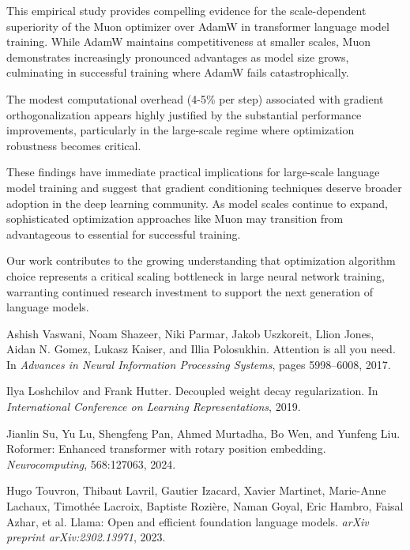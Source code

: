 \documentclass[11pt,a4paper]{article}
\begin{document}
This empirical study provides compelling evidence for the scale-dependent superiority of the Muon optimizer over AdamW in transformer language model training. While AdamW maintains competitiveness at smaller scales, Muon demonstrates increasingly pronounced advantages as model size grows, culminating in successful training where AdamW fails catastrophically.

The modest computational overhead (4-5\% per step) associated with gradient orthogonalization appears highly justified by the substantial performance improvements, particularly in the large-scale regime where optimization robustness becomes critical.

These findings have immediate practical implications for large-scale language model training and suggest that gradient conditioning techniques deserve broader adoption in the deep learning community. As model scales continue to expand, sophisticated optimization approaches like Muon may transition from advantageous to essential for successful training.

Our work contributes to the growing understanding that optimization algorithm choice represents a critical scaling bottleneck in large neural network training, warranting continued research investment to support the next generation of language models.

\begin{thebibliography}{9}

Ashish Vaswani, Noam Shazeer, Niki Parmar, Jakob Uszkoreit, Llion Jones, Aidan N. Gomez, Lukasz Kaiser, and Illia Polosukhin.
\newblock Attention is all you need.
\newblock In \emph{Advances in Neural Information Processing Systems}, pages 5998--6008, 2017.

Ilya Loshchilov and Frank Hutter.
\newblock Decoupled weight decay regularization.
\newblock In \emph{International Conference on Learning Representations}, 2019.

Jianlin Su, Yu Lu, Shengfeng Pan, Ahmed Murtadha, Bo Wen, and Yunfeng Liu.
\newblock Roformer: Enhanced transformer with rotary position embedding.
\newblock \emph{Neurocomputing}, 568:127063, 2024.

Hugo Touvron, Thibaut Lavril, Gautier Izacard, Xavier Martinet, Marie-Anne Lachaux, Timothée Lacroix, Baptiste Rozière, Naman Goyal, Eric Hambro, Faisal Azhar, et al.
\newblock Llama: Open and efficient foundation language models.
\newblock \emph{arXiv preprint arXiv:2302.13971}, 2023.

\end{thebibliography}
\end{document}
